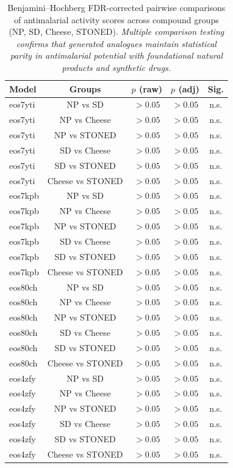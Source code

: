 \documentclass[journal=jcisd8,manuscript=suppinfo]{achemso}
\begin{document}
\begin{table}[htbp]
\centering
\caption{Benjamini--Hochberg FDR-corrected pairwise comparisons of antimalarial activity scores across compound groups (NP, SD, Cheese, STONED). \textit{Multiple comparison testing confirms that generated analogues maintain statistical parity in antimalarial potential with foundational natural products and synthetic drugs.}}
\label{tab:sm_s22_bh_correction}
\scriptsize
\begin{tabular}{@{}l c c c c@{}}
\toprule
\textbf{Model} & \textbf{Groups} & \textbf{$p$ (raw)} & \textbf{$p$ (adj)} & \textbf{Sig.} \\
\midrule
eos7yti & NP vs SD & $> \num{0.05}$ & $> \num{0.05}$ & n.s. \\
eos7yti & NP vs Cheese & $> \num{0.05}$ & $> \num{0.05}$ & n.s. \\
eos7yti & NP vs STONED & $> \num{0.05}$ & $> \num{0.05}$ & n.s. \\
eos7yti & SD vs Cheese & $> \num{0.05}$ & $> \num{0.05}$ & n.s. \\
eos7yti & SD vs STONED & $> \num{0.05}$ & $> \num{0.05}$ & n.s. \\
eos7yti & Cheese vs STONED & $> \num{0.05}$ & $> \num{0.05}$ & n.s. \\
eos7kpb & NP vs SD & $> \num{0.05}$ & $> \num{0.05}$ & n.s. \\
eos7kpb & NP vs Cheese & $> \num{0.05}$ & $> \num{0.05}$ & n.s. \\
eos7kpb & NP vs STONED & $> \num{0.05}$ & $> \num{0.05}$ & n.s. \\
eos7kpb & SD vs Cheese & $> \num{0.05}$ & $> \num{0.05}$ & n.s. \\
eos7kpb & SD vs STONED & $> \num{0.05}$ & $> \num{0.05}$ & n.s. \\
eos7kpb & Cheese vs STONED & $> \num{0.05}$ & $> \num{0.05}$ & n.s. \\
eos80ch & NP vs SD & $> \num{0.05}$ & $> \num{0.05}$ & n.s. \\
eos80ch & NP vs Cheese & $> \num{0.05}$ & $> \num{0.05}$ & n.s. \\
eos80ch & NP vs STONED & $> \num{0.05}$ & $> \num{0.05}$ & n.s. \\
eos80ch & SD vs Cheese & $> \num{0.05}$ & $> \num{0.05}$ & n.s. \\
eos80ch & SD vs STONED & $> \num{0.05}$ & $> \num{0.05}$ & n.s. \\
eos80ch & Cheese vs STONED & $> \num{0.05}$ & $> \num{0.05}$ & n.s. \\
eos4zfy & NP vs SD & $> \num{0.05}$ & $> \num{0.05}$ & n.s. \\
eos4zfy & NP vs Cheese & $> \num{0.05}$ & $> \num{0.05}$ & n.s. \\
eos4zfy & NP vs STONED & $> \num{0.05}$ & $> \num{0.05}$ & n.s. \\
eos4zfy & SD vs Cheese & $> \num{0.05}$ & $> \num{0.05}$ & n.s. \\
eos4zfy & SD vs STONED & $> \num{0.05}$ & $> \num{0.05}$ & n.s. \\
eos4zfy & Cheese vs STONED & $> \num{0.05}$ & $> \num{0.05}$ & n.s. \\
\bottomrule
\end{tabular}
\end{table}
\end{document}
